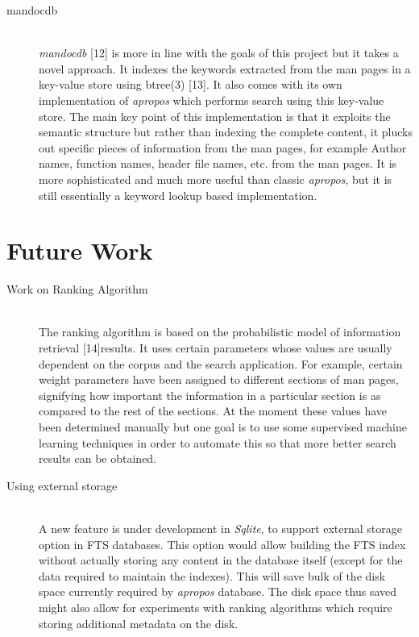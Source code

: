 \documentclass[letterpaper,twocolumn,10pt]{article}
\begin{document}
\begin{description}
\item[mandocdb] \hfill \\
\textit{mandocdb} [12] is more in line with the goals of this project but it
takes a novel approach. It indexes the keywords extracted from the man pages in a
key-value store using btree(3) [13]. It also comes with its own implementation
of \textit{apropos} which performs search using this key-value store. The
main key point of this implementation is that it exploits the semantic structure
but rather than indexing the complete content, it plucks out specific pieces of
information from the man pages, for example Author names, function names,
header file names, etc.
from the man pages. It is more sophisticated and much more useful than classic
\textit{apropos}, but it is still essentially a keyword lookup based
implementation.
\end{description}


\section{Future Work}
\begin{description}
\item[Work on Ranking Algorithm] \hfill \\
The ranking algorithm is based on the probabilistic model of information
retrieval [14]results. It
uses certain parameters whose values are usually dependent on the corpus and the
search application. For example, certain weight parameters have been assigned to
different sections of man pages, signifying how important the information in a
particular section is as compared to the rest of the sections. At the moment
these values have been determined
manually but one goal is to use some supervised machine learning techniques in
order to automate this so that more better search results can be obtained.
\end{description}

\begin{description}
\item[Using external storage] \hfill \\
A new feature is under development in \textit{Sqlite}, to support external
storage option in FTS databases. This option would allow building the FTS
index without actually storing any content in the database itself (except for
the data required to maintain the indexes). This will save bulk of the disk
space currently required by \textit{apropos} database. The disk space thus
saved might also allow for experiments with ranking algorithms which require
storing additional metadata on the disk.
\end{description}
\end{document}

